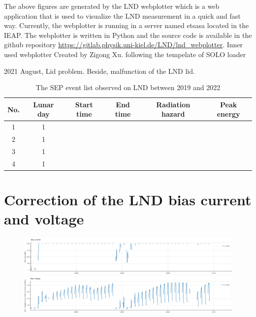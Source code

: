 The above figures are generated by the LND webplotter which is a web application that is used to visualize the LND measurement in a quick and fast way. 
Currently, the webplotter is running in a server named etsasa located in the IEAP.
The webplotter is written in Python and the source code is available in the github repository \url{https://gitlab.physik.uni-kiel.de/LND/lnd_webplotter}. 
Inner used webplotter 
Created by Zigong Xu. following the tempelate of SOLO loader

2021 August, Lid problem. Beside, malfunction of the LND lid.

\begin{table}[!h]
    \centering
    \caption[The SEP event list observed on LND]{The SEP event list observed on LND between 2019 and 2022}
\begin{tabular}{cccccc}
    \hline
    No.     & Lunar day & Start time    & End time      & Radiation hazard  & Peak energy\\
    \hline
    1       & 1         &               &               &  &\\
    2       & 1         &               &               &   &\\
    3       & 1         &               &               &   &\\
    4       & 1         &               &               &   &\\    
    \hline
\end{tabular}
\label{Tab:appendix_LND_SEP_list}
\end{table}

\section{Correction of the LND bias current and voltage}

\begin{figure}
    \centerfloat
    \includegraphics[angle = 90]{images/lnd_bias_current.png}
    \includegraphics{images/lnd_bias_voltage.png}
    \caption{}
    \label{}
\end{figure}


